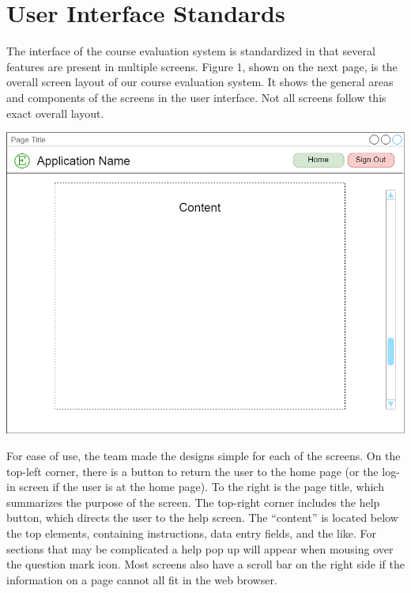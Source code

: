 \documentclass{article}
\begin{document}
\section{User Interface Standards}

The interface of the course evaluation system is standardized in that several features are present in multiple screens. Figure 1, shown on the next page, is the overall screen layout of our course evaluation system. It shows the general areas and components of the screens in the user interface. Not all screens follow this exact overall layout.

\newpage

\begin{center}
\vspace{3mm}
{\includegraphics[scale=0.5]{images/overall_layout.png}}
\vspace{2mm}
\end{center}

For ease of use, the team made the designs simple for each of the screens. On the top-left corner, there is a button to return the user to the home page (or the log-in screen if the user is at the home page). To the right is the page title, which summarizes the purpose of the screen. The top-right corner includes the help button, which directs the user to the help screen. The ``content'' is located below the top elements, containing instructions, data entry fields, and the like.  For sections that may be complicated a help pop up will appear when mousing over the question mark icon. Most screens also have a scroll bar on the right side if the information on a page cannot all fit in the web browser.
\end{document}
